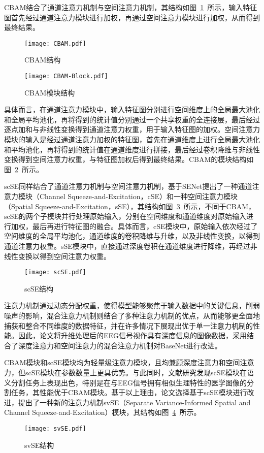 CBAM结合了通道注意力机制与空间注意力机制，其结构如图~\ref{fig:CBAM}~所示，输入特征图首先经过通道注意力模块进行加权，再通过空间注意力模块进行加权，从而得到最终结果。
\begin{figure}
    \centering
    \texttt{[image: CBAM.pdf]}
    \caption{CBAM结构\cite{woo2018cbam}}
    \label{fig:CBAM}
\end{figure}
\begin{figure}
    \centering
    \texttt{[image: CBAM-Block.pdf]}
    \caption{CBAM模块结构\cite{woo2018cbam}}
    \label{fig:CBAM-Block}
  \end{figure}

具体而言，在通道注意力模块中，输入特征图分别进行空间维度上的全局最大池化和全局平均池化，再将得到的统计值分别通过一个共享权重的全连接层，最后经过逐点加和与非线性变换得到通道注意力权重，用于输入特征图的加权。空间注意力模块的输入是经过通道注意力加权的特征图，首先在通道维度上进行全局最大池化和平均池化，再将得到的统计值在通道维度进行拼接，最后经过卷积降维与非线性变换得到空间注意力权重，与特征图加权后得到最终结果。CBAM的模块结构如图~\ref{fig:CBAM-Block}~所示。

scSE同样结合了通道注意力机制与空间注意力机制，基于SENet提出了一种通道注意力模块（Channel Squeeze-and-Excitation，cSE）和一种空间注意力模块（Spatial Squeeze-and-Excitation，sSE），其结构如图~\ref{fig:scSE}~所示，不同于CBAM，scSE的两个子模块并行处理原始输入，分别在空间维度和通道维度对原始输入进行加权，最后再进行特征图的融合。具体而言，cSE模块中，原始输入依次经过了空间维度的全局平均池化，通道维度的卷积降维与升维，以及非线性变换，以得到通道注意力权重。sSE模块中，直接通过深度卷积在通道维度进行降维，再经过非线性变换以得到空间注意力权重。
\begin{figure}
    \centering
    \texttt{[image: scSE.pdf]}
    \caption{scSE结构\cite{roy2018concurrent}}
    \label{fig:scSE}
\end{figure}

注意力机制通过动态分配权重，使得模型能够聚焦于输入数据中的关键信息，削弱噪声的影响，混合注意力机制则结合了多种注意力机制的优点，从而能够更全面地捕获和整合不同维度的数据特征，并在许多情况下展现出优于单一注意力机制的性能。因此，论文将升维处理后的EEG信号视作具有深度信息的图像数据，采用结合了深度注意力和空间注意力的混合注意力机制对BaseNet进行改进。

CBAM模块和scSE模块均为轻量级注意力模块，且均兼顾深度注意力和空间注意力，但scSE模块在参数数量上更具优势。与此同时，文献\cite{roy2018concurrent}研究发现scSE模块在语义分割任务上表现出色，特别是在与EEG信号拥有相似生理特性的医学图像的分割任务，其性能优于CBAM模块。基于以上理由，论文选择基于scSE模块进行改进，提出了一种新的注意力机制svSE（Separate Variance-Informed Spatial and Channel Squeeze-and-Excitation）模块，其结构如图~\ref{fig:svSE}~所示。
\begin{figure}
    \centering
    \texttt{[image: svSE.pdf]}
    \caption{svSE结构}
    \label{fig:svSE}
\end{figure}

